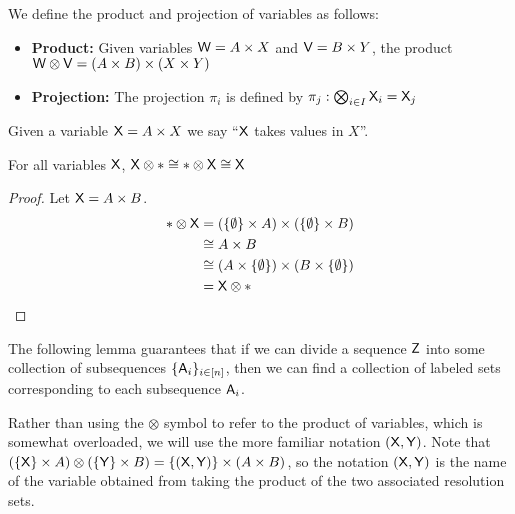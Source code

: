 We define the product and projection of variables as follows:

\begin{itemize}
	\item \textbf{Product:} Given variables $\mathsf{W}=A\times X$ and $\mathsf{V}=B\times Y$, the product $\mathsf{W}\otimes\mathsf{V}=(A\times B)\times (X\times Y)$
	\item \textbf{Projection:} The projection $\pi_i$ is defined by $\pi_j:\bigotimes_{i\in I} \mathsf{X}_i = \mathsf{X}_j$
\end{itemize}



Given a variable $\mathsf{X}=A\times X$ we say ``$\mathsf{X}$ takes values in $X$''.

\begin{lemma}\label{lem:se_id}
For all variables $\mathsf{X}$, $\mathsf{X}\otimes * \cong *\otimes \mathsf{X} \cong \mathsf{X}$
\end{lemma}

\begin{proof}
Let $\mathsf{X}=A\times B$.
\begin{align}
	*\otimes \mathsf{X} &= (\{\emptyset\}\times A)\times(\{\emptyset\}\times B)\\
					&\cong A\times B\\
					&\cong (A\times \{\emptyset\})\times(B\times \{\emptyset\})\\
					&= \mathsf{X}\otimes *
\end{align}
\end{proof}

The following lemma guarantees that if we can divide a sequence $\mathsf{Z}$ into some collection of subsequences $\{\mathsf{A}_i\}_{i\in [n]}$, then we can find a collection of labeled sets corresponding to each subsequence $\mathsf{A}_i$.

Rather than using the $\otimes$ symbol to refer to the product of variables, which is somewhat overloaded, we will use the more familiar notation $(\mathsf{X},\mathsf{Y})$. Note that $(\{\mathsf{X}\}\times A)\otimes (\{\mathsf{Y}\}\times B) = \{(\mathsf{X},\mathsf{Y})\}\times (A\times B)$, so the notation $(\mathsf{X},\mathsf{Y})$ is the name of the variable obtained from taking the product of the two associated resolution sets.

